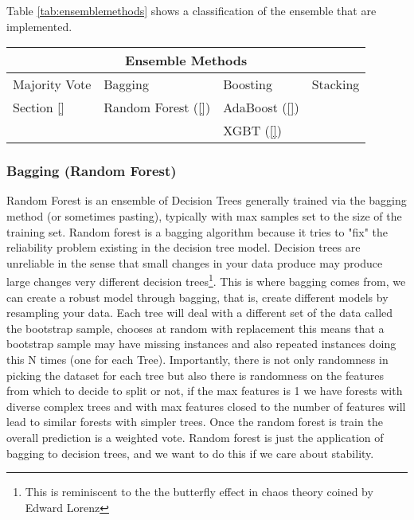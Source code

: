 \documentclass[11pt]{article}
\begin{document}
Table \ref{tab:ensemblemethods} shows a classification of the ensemble that are implemented.

 \label{tab:ensemblemethods} 
\begin{tabular}{ |p{3cm}||p{3cm}|p{3cm}|p{2cm}| } %
 \hline
 \multicolumn{4}{|c|}{Ensemble Methods} \\
 \hline
 Majority Vote& Bagging &Boosting&Stacking\\
 \hline
 Section \ref{}   & Random Forest (\ref{})  &AdaBoost (\ref{}) &   \\
  				  &                & XGBT (\ref{})&  \\

 \hline

\end{tabular}

\subsubsection{Bagging (Random Forest)}
\label{sse:rf}

Random Forest is an ensemble of Decision Trees generally trained via the bagging method (or sometimes pasting), typically with max samples set to the size of the training set.
Random forest is a bagging algorithm because it tries to "fix" the reliability problem existing in the decision tree model. Decision trees are unreliable in the sense that small changes in your data produce may produce large changes very different decision trees\footnote{This is reminiscent to the the butterfly effect in chaos theory coined by Edward Lorenz}. This is where bagging comes from, we can create a robust model through bagging, that is, create different models by resampling your data. Each tree will deal with a different set of the data called the bootstrap sample, chooses at random with replacement this means that a bootstrap sample may have missing instances and also repeated instances doing this N times (one for each Tree). Importantly, there is not only randomness in picking the dataset for each tree but also there is randomness on the features from which to decide to split or not, if the max features is 1 we have forests with diverse complex trees and with max features closed to the number of features will lead to similar forests with simpler trees. Once the random forest is train the overall prediction is a weighted vote.
Random forest is just the application of bagging to decision trees, and we want to do this if we care about stability.
\end{document}
